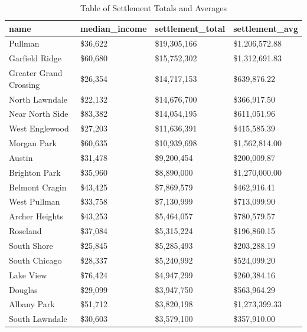 \documentclass{article}
\begin{document}
\begin{table}[h!]
\centering
\caption{Table of Settlement Totals and Averages}
\label{table1}
\begin{tabular}{|l|l|l|l|}
\hline
name                   & median\_income & settlement\_total & settlement\_avg \\
\hline
Pullman                & \$36,622       & \$19,305,166      & \$1,206,572.88  \\
Garfield Ridge         & \$60,680       & \$15,752,302      & \$1,312,691.83  \\
Greater Grand Crossing & \$26,354       & \$14,717,153      & \$639,876.22    \\
North Lawndale         & \$22,132       & \$14,676,700      & \$366,917.50    \\
Near North Side        & \$83,382       & \$14,054,195      & \$611,051.96    \\
West Englewood         & \$27,203       & \$11,636,391      & \$415,585.39    \\
Morgan Park            & \$60,635       & \$10,939,698      & \$1,562,814.00  \\
Austin                 & \$31,478       & \$9,200,454       & \$200,009.87    \\
Brighton Park          & \$35,960       & \$8,890,000       & \$1,270,000.00  \\
Belmont Cragin         & \$43,425       & \$7,869,579       & \$462,916.41    \\
West Pullman           & \$33,758       & \$7,130,999       & \$713,099.90    \\
Archer Heights         & \$43,253       & \$5,464,057       & \$780,579.57    \\
Roseland               & \$37,084       & \$5,315,224       & \$196,860.15    \\
South Shore            & \$25,845       & \$5,285,493       & \$203,288.19    \\
South Chicago          & \$28,337       & \$5,240,992       & \$524,099.20    \\
Lake View              & \$76,424       & \$4,947,299       & \$260,384.16    \\
Douglas                & \$29,099       & \$3,947,750       & \$563,964.29    \\
Albany Park            & \$51,712       & \$3,820,198       & \$1,273,399.33  \\
South Lawndale         & \$30,603       & \$3,579,100       & \$357,910.00    \\

\end{tabular}
\end{table}
\end{document}
